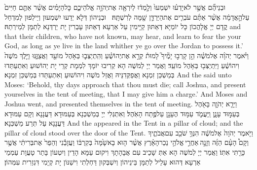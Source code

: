 {וּבְנֵיהֶ֞ם אֲשֶׁ֣ר לֹא\maqqaf יָדְע֗וּ יִשְׁמְעוּ֙ וְלָ֣מְד֔וּ לְיִרְאָ֖ה אֶת\maqqaf יְהֹוָ֣ה אֱלֹהֵיכֶ֑ם כׇּל\maqqaf הַיָּמִ֗ים אֲשֶׁ֨ר אַתֶּ֤ם חַיִּים֙ עַל\maqqaf הָ֣אֲדָמָ֔ה אֲשֶׁ֨ר אַתֶּ֜ם עֹבְרִ֧ים אֶת\maqqaf הַיַּרְדֵּ֛ן שָׁ֖מָּה לְרִשְׁתָּֽהּ׃ \petucha }
{וּבְנֵיהוֹן דְּלָא יְדַעוּ יִשְׁמְעוּן וְיֵילְפוּן לְמִדְחַל קֳדָם יְיָ אֱלָהֲכוֹן כָּל יוֹמַיָּא דְּאַתּוּן קַיָּימִין עַל אַרְעָא דְּאַתּוּן עָבְרִין יָת יַרְדְּנָא לְתַמָּן לְמֵירְתַהּ׃}
{and that their children, who have not known, may hear, and learn to fear the \lord\space your God, as long as ye live in the land whither ye go over the Jordan to possess it.’}{}
\newseder
{}%
{וַיֹּ֨אמֶר יְהֹוָ֜ה אֶל\maqqaf מֹשֶׁ֗ה הֵ֣ן קָרְב֣וּ יָמֶ֘יךָ֮ לָמוּת֒ קְרָ֣א אֶת\maqqaf יְהוֹשֻׁ֗עַ וְהִֽתְיַצְּב֛וּ בְּאֹ֥הֶל מוֹעֵ֖ד וַאֲצַוֶּ֑נּוּ וַיֵּ֤לֶךְ מֹשֶׁה֙ וִיהוֹשֻׁ֔עַ וַיִּֽתְיַצְּב֖וּ בְּאֹ֥הֶל מוֹעֵֽד׃}
{וַאֲמַר יְיָ לְמֹשֶׁה הָא קְרִיבוּ יוֹמָךְ לִמְמָת קְרֵי יָת יְהוֹשׁוּעַ וְאִתְעַתַּדוּ בְּמַשְׁכַּן זִמְנָא וַאֲפַקְּדִנֵּיהּ וַאֲזַל מֹשֶׁה וִיהוֹשׁוּעַ וְאִתְעַתַּדוּ בְּמַשְׁכַּן זִמְנָא׃}
{And the \lord\space said unto Moses: ‘Behold, thy days approach that thou must die; call Joshua, and present yourselves in the tent of meeting, that I may give him a charge.’ And Moses and Joshua went, and presented themselves in the tent of meeting.}{}
{וַיֵּרָ֧א יְהֹוָ֛ה בָּאֹ֖הֶל בְּעַמּ֣וּד עָנָ֑ן וַֽיַּעֲמֹ֛ד עַמּ֥וּד הֶעָנָ֖ן עַל\maqqaf פֶּ֥תַח הָאֹֽהֶל׃}
{וְאִתְגְּלִי יְיָ בְּמַשְׁכְּנָא בְּעַמּוּדָא דַּעֲנָנָא וְקָם עַמּוּדָא דַּעֲנָנָא עַל תְּרַע מַשְׁכְּנָא׃}
{And the \lord\space appeared in the Tent in a pillar of cloud; and the pillar of cloud stood over the door of the Tent.}{}
{וַיֹּ֤אמֶר יְהֹוָה֙ אֶל\maqqaf מֹשֶׁ֔ה הִנְּךָ֥ שֹׁכֵ֖ב עִם\maqqaf אֲבֹתֶ֑יךָ וְקָם֩ הָעָ֨ם הַזֶּ֜ה וְזָנָ֣ה \legarmeh  אַחֲרֵ֣י \legarmeh  אֱלֹהֵ֣י נֵכַר\maqqaf הָאָ֗רֶץ אֲשֶׁ֨ר ה֤וּא בָא\maqqaf שָׁ֙מָּה֙ בְּקִרְבּ֔וֹ וַעֲזָבַ֕נִי וְהֵפֵר֙ אֶת\maqqaf בְּרִיתִ֔י אֲשֶׁ֥ר כָּרַ֖תִּי אִתּֽוֹ׃}
{וַאֲמַר יְיָ לְמֹשֶׁה הָא אַתְּ שָׁכֵיב עִם אֲבָהָתָךְ וִיקוּם עַמָּא הָדֵין וְיִטְעוֹן בָּתַר טָעֲוָת עַמְמֵי אַרְעָא דְּהוּא עָלֵיל לְתַמָּן בֵּינֵיהוֹן וְיִשְׁבְּקוּן דַּחְלְתִי וִישַׁנּוֹן יָת קְיָמִי דִּגְזַרִית עִמְּהוֹן׃}
